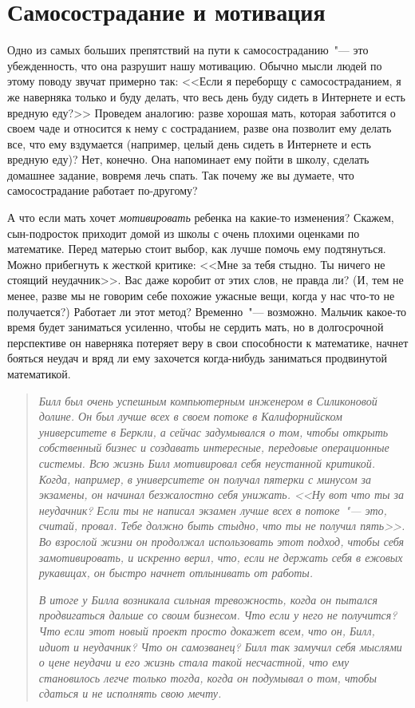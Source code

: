
\chapter{Самосострадание и мотивация} \label{Self-Compassionate_Motivation}

Одно из самых больших препятствий на пути к самосостраданию~"--- это убежденность, что она разрушит нашу мотивацию. Обычно мысли людей по этому поводу звучат примерно так: <<Если я переборщу с самосостраданием, я же наверняка только и буду делать, что весь день буду сидеть в Интернете и есть вредную еду?>> Проведем аналогию: разве хорошая мать, которая заботится о своем чаде и относится к нему с состраданием, разве она позволит ему делать все, что ему вздумается (например, целый день сидеть в Интернете и есть вредную еду)? Нет, конечно. Она напоминает ему пойти в школу, сделать домашнее задание, вовремя лечь спать. Так почему же вы думаете, что самосострадание работает по-другому? 

А что если мать хочет \emph{мотивировать} ребенка на какие-то изменения? Скажем, сын-подросток приходит домой из школы с очень плохими оценками по математике. Перед матерью стоит выбор, как лучше помочь ему подтянуться. Можно прибегнуть к жесткой критике: <<Мне за тебя стыдно. Ты ничего не стоящий неудачник>>. Вас даже коробит от этих слов, не правда ли? (И, тем не менее, разве мы не говорим себе похожие ужасные вещи, когда у нас что-то не получается?) Работает ли этот метод? Временно~"--- возможно. Мальчик какое-то время будет заниматься усиленно, чтобы не сердить мать, но в долгосрочной перспективе он наверняка потеряет веру в свои способности к математике, начнет бояться неудач и вряд ли ему захочется когда-нибудь заниматься продвинутой математикой. 

\begin{quotation}
	\textit{
		Билл был очень успешным компьютерным инженером в Силиконовой долине. Он был лучше всех в своем потоке в Калифорнийском университете в Беркли, а сейчас задумывался о том, чтобы открыть собственный бизнес и создавать интересные, передовые операционные системы. Всю жизнь Билл мотивировал себя неустанной критикой. Когда, например, в университете он получал пятерки с минусом за экзамены, он начинал безжалостно себя унижать. <<Ну вот что ты за неудачник? Если ты не написал экзамен лучше всех в потоке~"--- это, считай, провал. Тебе должно быть стыдно, что ты не получил пять>>. Во взрослой жизни он продолжал использовать этот подход, чтобы себя замотивировать, и искренно верил, что, если не держать себя в ежовых рукавицах, он быстро начнет отлынивать от работы.
	}

	\textit{	
		В итоге у Билла возникала сильная тревожность, когда он пытался продвигаться дальше со своим бизнесом. Что если у него не получится? Что если этот новый проект просто докажет всем, что он, Билл, идиот и неудачник? Что он самозванец? Билл так замучил себя мыслями о цене неудачи и его жизнь стала такой несчастной, что ему становилось легче только тогда, когда он подумывал о том, чтобы сдаться и не исполнять свою мечту.
	}
\end{quotation}

